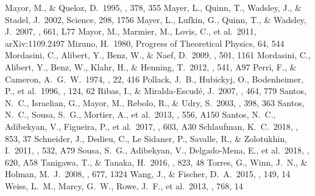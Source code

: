 \documentclass[twocolumn, dvipdfmx]{aastex62}
\begin{document}
\begin{CJK*}{UTF8}{min}
\begin{thebibliography}{}
 Mayor, M., \& Queloz, D.\ 1995, \nat, 378, 355
 Mayer, L., Quinn, T., Wadsley, J., \& Stadel, J.\ 2002, Science, 298, 1756
 Mayer, L., Lufkin, G., Quinn, T., \& Wadsley, J.\ 2007, \apjl, 661, L77
 Mayor, M., Marmier, M., Lovis, C., et al.\ 2011, arXiv:1109.2497
 Mizuno, H.\ 1980, Progress of Theoretical Physics, 64, 544
 Mordasini, C., Alibert, Y., Benz, W., \& Naef, D.\ 2009, \aap, 501, 1161
 Mordasini, C., Alibert, Y., Benz, W., Klahr, H., \& Henning, T.\ 2012, \aap, 541, A97
 Perri, F., \& Cameron, A.~G.~W.\ 1974, \icarus, 22, 416
 Pollack, J.~B., Hubickyj, O., Bodenheimer, P., et al.\ 1996, \icarus, 124, 62
 Ribas, I., \& Miralda-Escud{\'e}, J.\ 2007, \aap, 464, 779
 Santos, N.~C., Israelian, G., Mayor, M., Rebolo, R., \& Udry, S.\ 2003, \aap, 398, 363
 Santos, N.~C., Sousa, S.~G., Mortier, A., et al.\ 2013, \aap, 556, A150
 Santos, N.~C., Adibekyan, V., Figueira, P., et al.\ 2017, \aap, 603, A30
 Schlaufman, K.~C.\ 2018, \apj, 853, 37
 Schneider, J., Dedieu, C., Le Sidaner, P., Savalle, R., \& Zolotukhin, I.\ 2011, \aap, 532, A79
 Sousa, S.~G., Adibekyan, V., Delgado-Mena, E., et al.\ 2018, \aap, 620, A58
 Tanigawa, T., \& Tanaka, H.\ 2016, \apj, 823, 48
 Torres, G., Winn, J.~N., \& Holman, M.~J.\ 2008, \apj, 677, 1324
 Wang, J., \& Fischer, D.~A.\ 2015, \aj, 149, 14
 Weiss, L.~M., Marcy, G.~W., Rowe, J.~F., et al.\ 2013, \apj, 768, 14

\end{thebibliography}


\end{CJK*}
\end{document}

